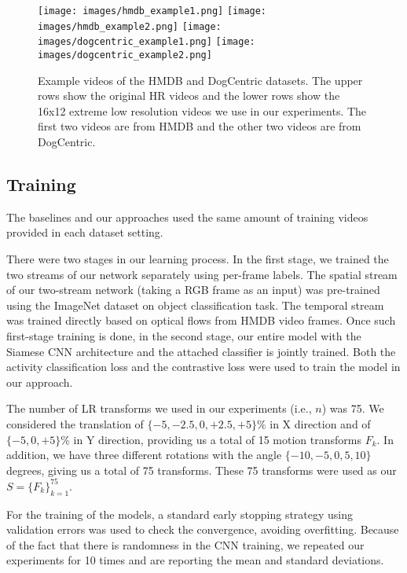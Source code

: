 \documentclass[letterpaper]{article} %
\begin{document}
\begin{figure}
\begin{center}
   \texttt{[image: images/hmdb\_example1.png]}
   \texttt{[image: images/hmdb\_example2.png]}
   \texttt{[image: images/dogcentric\_example1.png]}
   \texttt{[image: images/dogcentric\_example2.png]}
\end{center}
   \caption{Example videos of the HMDB and DogCentric datasets. The upper rows show the original HR videos and the lower rows show the 16x12 extreme low resolution videos we use in our experiments. The first two videos are from HMDB and the other two videos are from DogCentric.}
\label{fig:videos}		
\end{figure}


\subsection{Training}

The baselines and our approaches used the same amount of training videos provided in each dataset setting.

There were two stages in our learning process. In the first stage, we trained the two streams of our network separately using per-frame labels. The spatial stream of our two-stream network (taking a RGB frame as an input) was pre-trained using the ImageNet dataset on object classification task. The temporal stream was trained directly based on optical flows from HMDB video frames. Once such first-stage training is done, in the second stage, our entire model with the Siamese CNN architecture and the attached classifier is jointly trained. Both the activity classification loss and the contrastive loss were used to train the model in our approach.

The number of LR transforms we used in our experiments (i.e., $n$) was 75. We considered the translation of $\{-5, -2.5, 0, +2.5, +5\} \%$ in X direction and of $\{-5, 0, +5\} \%$ in Y direction, providing us a total of 15 motion transforms $F_k$. In addition, we have three different rotations with the angle $\{-10, -5, 0, 5, 10\}$ degrees, giving us a total of 75 transforms. These 75 transforms were used as our $S = \{F_k\}^{75}_{k=1}$.

For the training of the models, a standard early stopping strategy using validation errors was used to check the convergence, avoiding overfitting. Because of the fact that there is randomness in the CNN training, we repeated our experiments for 10 times and are reporting the mean and standard deviations.
\end{document}
